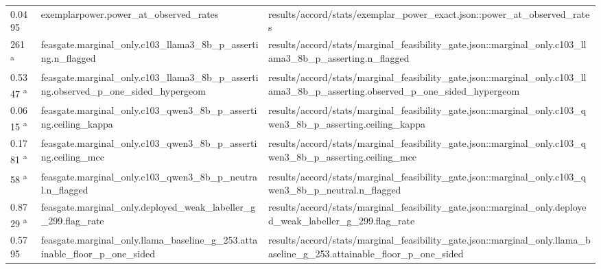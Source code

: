 \begin{longtable}{@{}p{0.7in}p{1.9in}p{2.6in}@{}}
0.0495 & exemplarpower.\allowbreak{}power\_at\_observed\_rates & results/\allowbreak{}accord/\allowbreak{}stats/\allowbreak{}exemplar\_power\_exact.\allowbreak{}json::power\_at\_observed\_rates\\
261 \textsuperscript{a} & feasgate.\allowbreak{}marginal\_only.\allowbreak{}c103\_llama3\_8b\_p\_asserting.\allowbreak{}n\_flagged & results/\allowbreak{}accord/\allowbreak{}stats/\allowbreak{}marginal\_feasibility\_gate.\allowbreak{}json::marginal\_only.\allowbreak{}c103\_llama3\_8b\_p\_asserting.\allowbreak{}n\_flagged\\
0.5347 \textsuperscript{a} & feasgate.\allowbreak{}marginal\_only.\allowbreak{}c103\_llama3\_8b\_p\_asserting.\allowbreak{}observed\_p\_one\_sided\_hypergeom & results/\allowbreak{}accord/\allowbreak{}stats/\allowbreak{}marginal\_feasibility\_gate.\allowbreak{}json::marginal\_only.\allowbreak{}c103\_llama3\_8b\_p\_asserting.\allowbreak{}observed\_p\_one\_sided\_hypergeom\\
0.0615 \textsuperscript{a} & feasgate.\allowbreak{}marginal\_only.\allowbreak{}c103\_qwen3\_8b\_p\_asserting.\allowbreak{}ceiling\_kappa & results/\allowbreak{}accord/\allowbreak{}stats/\allowbreak{}marginal\_feasibility\_gate.\allowbreak{}json::marginal\_only.\allowbreak{}c103\_qwen3\_8b\_p\_asserting.\allowbreak{}ceiling\_kappa\\
0.1781 \textsuperscript{a} & feasgate.\allowbreak{}marginal\_only.\allowbreak{}c103\_qwen3\_8b\_p\_asserting.\allowbreak{}ceiling\_mcc & results/\allowbreak{}accord/\allowbreak{}stats/\allowbreak{}marginal\_feasibility\_gate.\allowbreak{}json::marginal\_only.\allowbreak{}c103\_qwen3\_8b\_p\_asserting.\allowbreak{}ceiling\_mcc\\
58 \textsuperscript{a} & feasgate.\allowbreak{}marginal\_only.\allowbreak{}c103\_qwen3\_8b\_p\_neutral.\allowbreak{}n\_flagged & results/\allowbreak{}accord/\allowbreak{}stats/\allowbreak{}marginal\_feasibility\_gate.\allowbreak{}json::marginal\_only.\allowbreak{}c103\_qwen3\_8b\_p\_neutral.\allowbreak{}n\_flagged\\
0.8729 \textsuperscript{a} & feasgate.\allowbreak{}marginal\_only.\allowbreak{}deployed\_weak\_labeller\_g\_299.\allowbreak{}flag\_rate & results/\allowbreak{}accord/\allowbreak{}stats/\allowbreak{}marginal\_feasibility\_gate.\allowbreak{}json::marginal\_only.\allowbreak{}deployed\_weak\_labeller\_g\_299.\allowbreak{}flag\_rate\\
0.5795 & feasgate.\allowbreak{}marginal\_only.\allowbreak{}llama\_baseline\_g\_253.\allowbreak{}attainable\_floor\_p\_one\_sided & results/\allowbreak{}accord/\allowbreak{}stats/\allowbreak{}marginal\_feasibility\_gate.\allowbreak{}json::marginal\_only.\allowbreak{}llama\_baseline\_g\_253.\allowbreak{}attainable\_floor\_p\_one\_sided\\

\end{longtable}
